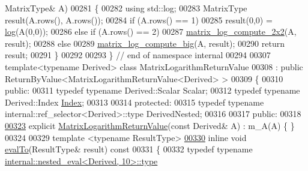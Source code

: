 \begin{DoxyCode}
      MatrixType& A)
00281 \{
00282   \textcolor{keyword}{using} std::log;
00283   MatrixType result(A.rows(), A.rows());
00284   \textcolor{keywordflow}{if} (A.rows() == 1)
00285     result(0,0) = \hyperlink{structlog}{log}(A(0,0));
00286   \textcolor{keywordflow}{else} \textcolor{keywordflow}{if} (A.rows() == 2)
00287     \hyperlink{namespace_eigen_1_1internal_a1cb8d312c017f94570a52317fd1ece5f}{matrix\_log\_compute\_2x2}(A, result);
00288   \textcolor{keywordflow}{else}
00289     \hyperlink{namespace_eigen_1_1internal_ac2de7acbbff34ec236ee5e9fdb2eee38}{matrix\_log\_compute\_big}(A, result);
00290   \textcolor{keywordflow}{return} result;
00291 \}
00292 
00293 \} \textcolor{comment}{// end of namespace internal}
00294 
00307 \textcolor{keyword}{template}<\textcolor{keyword}{typename} Derived> \textcolor{keyword}{class }MatrixLogarithmReturnValue
00308 : \textcolor{keyword}{public} ReturnByValue<MatrixLogarithmReturnValue<Derived> >
00309 \{
00310 \textcolor{keyword}{public}:
00311   \textcolor{keyword}{typedef} \textcolor{keyword}{typename} Derived::Scalar Scalar;
00312   \textcolor{keyword}{typedef} \textcolor{keyword}{typename} Derived::Index \hyperlink{namespace_eigen_a62e77e0933482dafde8fe197d9a2cfde}{Index};
00313 
00314 \textcolor{keyword}{protected}:
00315   \textcolor{keyword}{typedef} \textcolor{keyword}{typename} internal::ref\_selector<Derived>::type DerivedNested;
00316 
00317 \textcolor{keyword}{public}:
00318 
\hyperlink{class_eigen_1_1_matrix_logarithm_return_value_adfd2417a3d6f671e156b4ab1b92f1837}{00323}   \textcolor{keyword}{explicit} \hyperlink{class_eigen_1_1_matrix_logarithm_return_value_adfd2417a3d6f671e156b4ab1b92f1837}{MatrixLogarithmReturnValue}(\textcolor{keyword}{const} Derived& A) : m\_A(A) \{ \}
00324   
00329   \textcolor{keyword}{template} <\textcolor{keyword}{typename} ResultType>
\hyperlink{class_eigen_1_1_matrix_logarithm_return_value_ac17537a51ce53a44746fabd7a83d29d3}{00330}   \textcolor{keyword}{inline} \textcolor{keywordtype}{void} \hyperlink{class_eigen_1_1_matrix_logarithm_return_value_ac17537a51ce53a44746fabd7a83d29d3}{evalTo}(ResultType& result)\textcolor{keyword}{ const}
00331 \textcolor{keyword}{  }\{
00332     \textcolor{keyword}{typedef} \textcolor{keyword}{typename} \hyperlink{class_eigen_1_1internal_1_1_tensor_lazy_evaluator_writable}{internal::nested\_eval<Derived, 10>::type} 

\end{DoxyCode}

